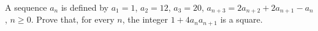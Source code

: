 A sequence $a_n$ is defined by $a_1 = 1$, $a_2 = 12$, $a_3 = 20$, $a_{n+3} = 2a_{n+2} + 2a_{n+1} - a_n$, $n \geq 0$. Prove that, for every $n$, the integer $1 + 4a_na_{n+1}$ is a square.
